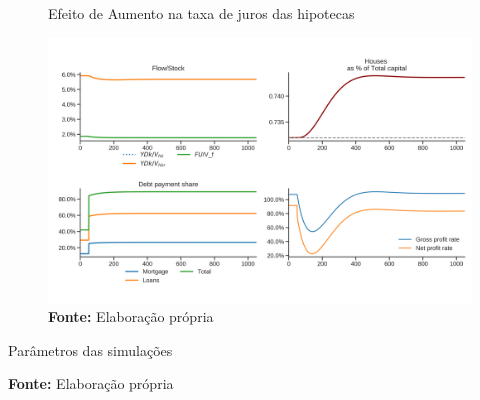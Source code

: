\begin{figure}[H]
	\centering
	\caption{Efeito de Aumento na taxa de juros das hipotecas}
	\label{choque_3Norms}
	\includegraphics[width=\textwidth]{../../Modelo/Versoes/Shock_3Norms.png}
	\caption*{\textbf{Fonte:} Elaboração própria}
\end{figure}



\begin{table}[H]
    \centering
    \caption{Parâmetros das simulações}
    \label{Resumo_Simulacao}
	
    \caption*{\textbf{Fonte:} Elaboração própria}
\end{table}


